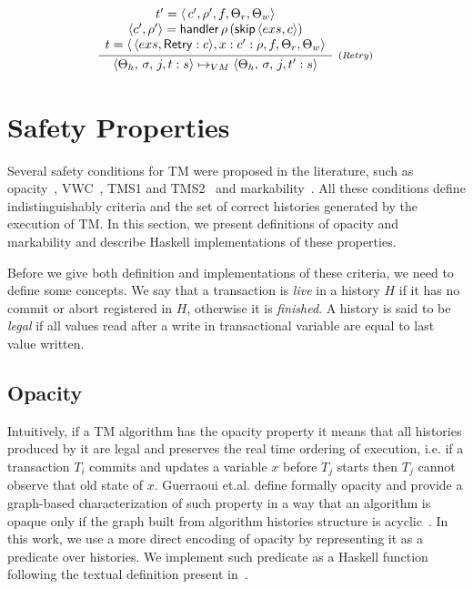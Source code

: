 \documentclass[sigplan, anonymous, review]{acmart}
\theoremstyle{definition}
\newcommand{\C}[1]{\red{\mathsf{#1}}}
\newcommand{\F}[1]{\green{\mathsf{#1}}}
\begin{document}
\[
  \begin{array}{c}
     \infer[_{(Retry)}]
            {\langle \Theta_h,\,\sigma,\,j,t : s\rangle \mapsto_{VM}
             \langle \Theta_h,\,\sigma,\,j,t' : s\rangle}
            {\begin{array}{c}
               t' = \langle\,c', \rho', f, \Theta_r,\Theta_w\rangle \\
               \langle c', \rho' \rangle = \ensuremath{\F{handler}}\,\rho\,(\ensuremath{\F{skip}}\, \langle exs, c \rangle)\\
               t = \langle\,\langle exs, \ensuremath{\C{Retry}} : c\rangle,x : c' : \rho, f, \Theta_r,\Theta_w\rangle
             \end{array}}
  \end{array}
\]

\section{Safety Properties}\label{sec:stm-safety}

Several safety conditions for TM were proposed in the literature, such as opacity~\cite{Guerraoui2008},
VWC~\cite{Imbs2009}, TMS1 and TMS2~\cite{Doherty2009} and markability~\cite{LesaniP14}. All these conditions define
indistinguishably criteria and the set of correct histories generated by the execution of TM. In this section, we
present definitions of opacity and markability and describe Haskell implementations of these properties.

Before we give both definition and implementations of these criteria, we need to define some concepts. We say that a transaction
is \emph{live} in a history $H$ if it has no commit or abort registered in $H$, otherwise it is \emph{finished}. A history is said to be \emph{legal}
if all values read after a write in transactional variable are equal to last value written.

\subsection{Opacity}


Intuitively, if a TM algorithm has the opacity property it means that all histories produced by it are legal and
preserves the real time ordering of execution, i.e. if a transaction $T_i$ commits and updates a variable $x$ before
$T_j$ starts then $T_j$ cannot observe that old state of $x$. Guerraoui et.al. define formally opacity and provide a
graph-based characterization of such property in a way that an algorithm is opaque only if the graph built from algorithm
histories structure is acyclic~\cite{Guerraoui2008}. In this work, we use a more direct encoding of opacity by representing it
as a predicate over histories. We implement such predicate as a Haskell function following the textual definition
present in~\cite{Guerraoui2010}.
\end{document}
